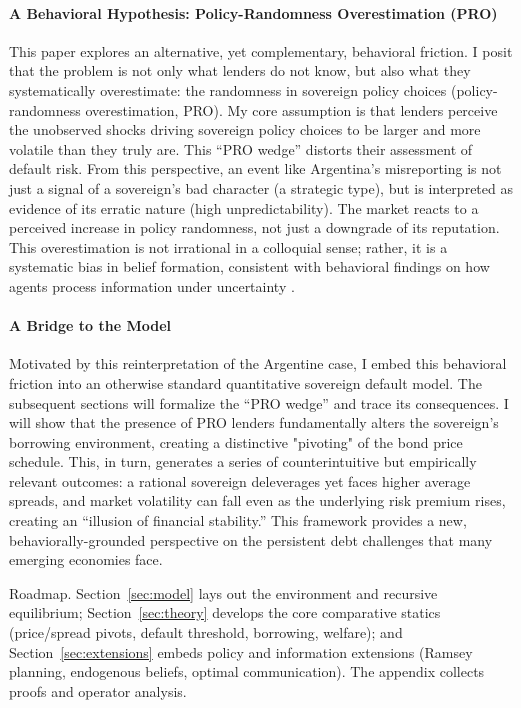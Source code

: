 \documentclass[12pt]{article}
\theoremstyle{plain}
\begin{document}
\paragraph{A Behavioral Hypothesis: Policy-Randomness Overestimation (PRO)}
This paper explores an alternative, yet complementary, behavioral friction. I
posit that the problem is not only what lenders do not know, but also what they
systematically overestimate: the randomness in sovereign policy choices
(policy-randomness overestimation, PRO). My core assumption is that lenders
perceive the unobserved shocks driving sovereign policy choices to be larger
and more volatile than they truly are. This ``PRO wedge'' distorts their
assessment of default risk. From this perspective, an event like Argentina's
misreporting is not just a signal of a sovereign's bad character (a strategic
type), but is interpreted as evidence of its erratic nature (high
unpredictability). The market reacts to a perceived increase in policy
randomness, not just a downgrade of its reputation. This overestimation is not
irrational in a colloquial sense; rather, it is a systematic bias in belief
formation, consistent with behavioral findings on how agents process
information under uncertainty \citep{TverskyKahneman1974, BarberisThaler2003}.

\paragraph{A Bridge to the Model}
Motivated by this reinterpretation of the Argentine case, I embed this
behavioral friction into an otherwise standard quantitative sovereign default
model. The subsequent sections will formalize the ``PRO wedge'' and trace its
consequences. I will show that the presence of PRO lenders fundamentally alters
the sovereign's borrowing environment, creating a distinctive "pivoting" of the
bond price schedule. This, in turn, generates a series of counterintuitive but
empirically relevant outcomes: a rational sovereign deleverages yet faces
higher average spreads, and market volatility can fall even as the underlying
risk premium rises, creating an ``illusion of financial stability.'' This
framework provides a new, behaviorally-grounded perspective on the persistent
debt challenges that many emerging economies face.

Roadmap. Section~\ref{sec:model} lays out the environment and recursive
equilibrium; Section~\ref{sec:theory} develops the core comparative statics
(price/spread pivots, default threshold, borrowing, welfare); and
Section~\ref{sec:extensions} embeds policy and information extensions (Ramsey
planning, endogenous beliefs, optimal communication). The appendix collects
proofs and operator analysis.
\end{document}
